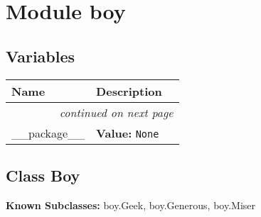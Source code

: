 %
%
%


\section{Module boy}

    \label{boy}


  \subsection{Variables}

    \vspace{-1cm}
\hspace{\varindent}\begin{longtable}{|p{\varnamewidth}|p{\vardescrwidth}|l}
\cline{1-2}
\cline{1-2} \centering \textbf{Name} & \centering \textbf{Description}& \\
\cline{1-2}
\endhead\cline{1-2}\multicolumn{3}{r}{\small\textit{continued on next page}}\\\endfoot\cline{1-2}
\endlastfoot\raggedright \_\-\_\-p\-a\-c\-k\-a\-g\-e\-\_\-\_\- & \raggedright \textbf{Value:} 
{\tt None}&\\
\cline{1-2}
\end{longtable}



\subsection{Class Boy}

    \label{boy:Boy}
\textbf{Known Subclasses:}
boy.Geek,
    boy.Generous,
    boy.Miser


